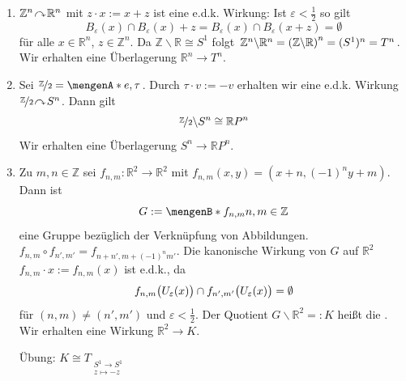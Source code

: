 \begin{enumerate}[(1)]
	\item $\mathds{Z}^n \wirkung \mathds{R}^n$ mit $z \cdot x := x + z$ ist eine e.d.k. Wirkung: Ist $\varepsilon < \frac{1}{2}$ so gilt 
	\[
		B_\varepsilon(x) \cap B_\varepsilon(x) + z = B_\varepsilon(x) \cap B_\varepsilon(x +z) = \emptyset
	\]
	für alle $x \in \mathds{R}^n$, $z \in \mathds{Z}^n$. Da $\mathds{Z} \backslash \mathds{R} \cong S^1$ folgt 
	$\mathds{Z}^n \backslash \mathds{R}^n = \enbrace*{\mathds{Z} \backslash \mathds{R}}^n = (S^1)^n = T^n $. Wir erhalten eine Überlagerung $\mathds{R}^n \to T^n$.
	\item Sei $\nicefrac{\mathds{Z}}{2} = \set{e, \tau}$. Durch $\tau \cdot v := - v$ erhalten wir eine e.d.k. Wirkung $\nicefrac{\mathds{Z}}{2} \wirkung S^n$. Dann gilt
	\[
		\nicefrac{\mathds{Z}}{2} \backslash S^n \cong \mathds{R}P^n
	\]
	Wir erhalten eine Überlagerung $S^n \to \mathds{R}P^n$. 
	\item Zu $m,n \in \mathds{Z}$ sei $f_{n,m} : \mathds{R}^2 \to \mathds{R}^2$ mit $f_{n,m} (x,y) = (x + n, (-1)^n y + m)$. Dann ist 
	\[
		G := \set[f_{n,m}]{n,m \in \mathds{Z}} 
	\]
	eine Gruppe bezüglich der Verknüpfung von Abbildungen. $f_{n,m} \circ f_{n',m'} = f_{n+n', m+ (-1)^n m'}$. Die kanonische Wirkung von $G$ auf $\mathds{R}^2$ 
	$f_{n,m} \cdot x := f_{n,m}(x)$ ist e.d.k., da 
	\[
		f_{n,m} \enbrace[\big]{U_\varepsilon(x)} \cap f_{n',m'} \enbrace[\big]{U_\varepsilon(x)} = \emptyset  
	\]
	für $(n,m) \not= (n',m')$ und $\varepsilon < \frac{1}{2}$. Der Quotient $G\backslash \mathds{R}^2 =: K$ heißt die . Wir erhalten eine Wirkung
	$\mathds{R}^2 \to K$. 
	\begin{figure}[h]
	\end{figure}
	Übung: $K \cong T_{\substack{S^1 \to S^1 \\ z \mapsto -z}}$ 
\end{enumerate}

